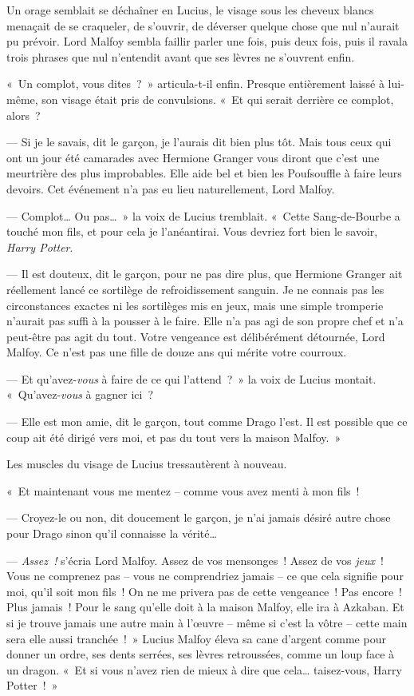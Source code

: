 Un orage semblait se déchaîner en Lucius, le visage sous les cheveux blancs menaçait de se craqueler, de s'ouvrir, de déverser quelque chose que nul n'aurait pu prévoir. Lord Malfoy sembla faillir parler une fois, puis deux fois, puis il ravala trois phrases que nul n'entendit avant que ses lèvres ne s'ouvrent enfin.

«~Un complot, vous dites~?~» articula-t-il enfin. Presque entièrement laissé à lui-même, son visage était pris de convulsions. «~Et qui serait derrière ce complot, alors~?

--- Si je le savais, dit le garçon, je l'aurais dit bien plus tôt. Mais tous ceux qui ont un jour été camarades avec Hermione Granger vous diront que c'est une meurtrière des plus improbables. Elle aide bel et bien les Poufsouffle à faire leurs devoirs. Cet événement n'a pas eu lieu naturellement, Lord Malfoy.

--- Complot… Ou pas…~» la voix de Lucius tremblait. «~Cette Sang-de-Bourbe a touché mon fils, et pour cela je l'anéantirai. Vous devriez fort bien le savoir, \emph{Harry Potter}.

--- Il est douteux, dit le garçon, pour ne pas dire plus, que Hermione Granger ait réellement lancé ce sortilège de refroidissement sanguin. Je ne connais pas les circonstances exactes ni les sortilèges mis en jeux, mais une simple tromperie n'aurait pas suffi à la pousser à le faire. Elle n'a pas agi de son propre chef et n'a peut-être pas agit du tout. Votre vengeance est délibérément détournée, Lord Malfoy. Ce n'est pas une fille de douze ans qui mérite votre courroux.

--- Et qu'avez-\emph{vous} à faire de ce qui l'attend~?~» la voix de Lucius montait. «~Qu'avez-\emph{vous} à gagner ici~?

--- Elle est mon amie, dit le garçon, tout comme Drago l'est. Il est possible que ce coup ait été dirigé vers moi, et pas du tout vers la maison Malfoy.~»

Les muscles du visage de Lucius tressautèrent à nouveau.

«~Et maintenant vous me mentez -- comme vous avez menti à mon fils~!

--- Croyez-le ou non, dit doucement le garçon, je n'ai jamais désiré autre chose pour Drago sinon qu'il connaisse la vérité…

--- \emph{Assez~!} s'écria Lord Malfoy. Assez de vos mensonges~! Assez de vos \emph{jeux}~! Vous ne comprenez pas -- vous ne comprendriez jamais -- ce que cela signifie pour moi, qu'il soit mon fils~! On ne me privera pas de cette vengeance~! Pas encore~! Plus jamais~! Pour le sang qu'elle doit à la maison Malfoy, elle ira à Azkaban. Et si je trouve jamais une autre main à l'œuvre -- même si c'est la vôtre -- cette main sera elle aussi tranchée~!~» Lucius Malfoy éleva sa cane d'argent comme pour donner un ordre, ses dents serrées, ses lèvres retroussées, comme un loup face à un dragon. «~Et si vous n'avez rien de mieux à dire que cela… taisez-vous, Harry Potter~!~»

